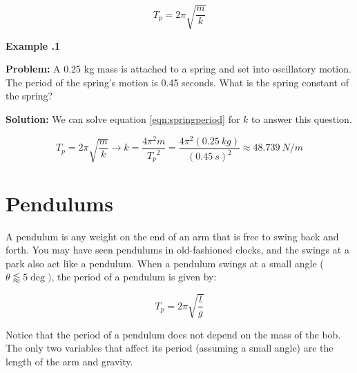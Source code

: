 		\begin{mdframed}[backgroundcolor=orange!20!white]
		\begin{equation}
		T_p = 2 \pi \sqrt{\frac{m}{k}}
		\label{eqn:springperiod}
		\end{equation}
	\end{mdframed}
	
	
	\begin{mdframed}[backgroundcolor=blue!10!white]
		\begin{center}
			
			
			\textbf{Example \thesection.1}	
		\end{center}
		
		\textbf{Problem: } A 0.25 kg mass is attached to a spring and set into oscillatory motion.  The period of the spring's motion is 0.45 seconds.  What is the spring constant of the spring? 
		
		\vspace{0.1in}
		
		\textbf{Solution:} 
		We can solve equation \ref{eqn:springperiod} for $k$ to answer this question.  
		
		\begin{equation*}
				T_p = 2 \pi \sqrt{\frac{m}{k}} \longrightarrow k = \frac{4\pi^2m}{{T_p}^2}  = \frac{4\pi^2(\SI{0.25}{kg})}{(\SI{0.45}{s})^2} \approx \SI{48.739}{N/m}
		\end{equation*}
		
		
		
		
		
	\end{mdframed}
	
	\section{Pendulums}
	A pendulum is any weight on the end of an arm that is free to swing back and forth.  You may have seen pendulums in old-fashioned clocks, and the swings at a park also act like a pendulum.  When a pendulum swings at a small angle ($\theta \lessapprox 5 \deg)$, the period of a pendulum is given by:
	
	\begin{mdframed}[backgroundcolor=orange!20!white]
		\begin{equation}
			T_p = 2 \pi \sqrt{\frac{l}{g}}
			\label{eqn:pendulumperiod}
		\end{equation}
	\end{mdframed}
	
	Notice that the period of a pendulum does not depend on the mass of the bob.  The only two variables that affect its period (assuming a small angle) are the length of the arm and gravity.  
	
	
	 
	

		


	


